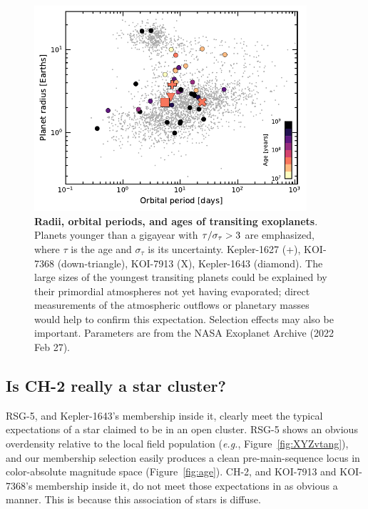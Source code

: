 \documentclass[12pt,twocolumn,linenumbers]{aastex63}
\begin{document}
\begin{figure}[!t]
	\begin{center}
		\leavevmode
		\includegraphics[width=0.9\textwidth]{f4.pdf}
	\end{center}
	\vspace{-0.7cm}
	\caption{
		{\bf Radii, orbital periods, and ages of transiting exoplanets}.
		Planets younger than a gigayear with ${\rm \tau}/\sigma_{\tau} >
		3$ are emphasized, where $\tau$ is the age and $\sigma_{\tau}$ is
		its uncertainty. Kepler-1627 (+), KOI-7368 (down-triangle),
		KOI-7913 (X), Kepler-1643 (diamond).  The large sizes of the
		youngest transiting planets could be explained by their primordial
		atmospheres not yet having evaporated; direct measurements of the
		atmospheric outflows or planetary masses would help to confirm
		this expectation.  Selection effects may also be important.
		Parameters are from the NASA Exoplanet Archive (2022 Feb 27).
		\label{fig:rp_period_age}
	}
\end{figure}


\subsection{Is CH-2 really a star cluster?}

RSG-5, and Kepler-1643's membership inside it, clearly meet the
typical expectations of a star claimed to be in an open cluster.
RSG-5 shows an obvious overdensity relative to the local field
population ({\it e.g.}, Figure~\ref{fig:XYZvtang}), and our membership
selection easily produces a clean pre-main-sequence locus in 
color-absolute magnitude space (Figure~\ref{fig:age}).
CH-2, and KOI-7913 and KOI-7368's membership inside it, do not meet
those expectations in as obvious a manner.  This is because this
association of stars is diffuse.
\end{document}
